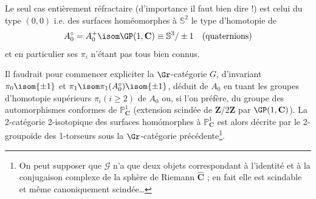 Le seul cas entièrement réfractaire (d'importance il faut bien dire !) est celui du type $(0, 0)$ i.e. des surfaces homéomorphes à $\mathbb{S}^2$ le type d'homotopie de 
$$
A^\circ_0 = A^+_0 \isom \GP (1, \mathbf{C}) \equiv \mathbb{S}^3 / \pm 1 \quad \text{(quaternions)}
$$
et en particulier ses $\pi_i$ n'étant pas tous bien connus.

Il faudrait pour commencer expliciter la $\Gr$-catégorie $G$, d'invariant $\pi_0 \isom \{ \pm 1 \}$ et $\pi_1 \isom \pi_1 (A^\circ_0) \isom \{ \pm 1 \}$, déduit de $A_0$ en tuant les groupes d'homotopie supérieurs $\pi_i (i \geq 2)$ de $A_0$ ou, si l'on préfère, du groupe des automorphismes conformes de $\mathbb{P}^1_{\mathbf{C}}$ (extension scindée de $\mathbf{Z}/2\mathbf{Z}$ par $\GP (1, \mathbf{C})$). La 2-catégorie 2-isotopique des surfaces homómorphes à $\mathbb{P}^1_{\mathbf{C}}$ est alors décrite par le 2-groupoïde des 1-torseurs sous la $\Gr$-catégorie précédente\footnote{On peut supposer que $\mathcal{G}$ n'a que deux objets correspondant à l'identité et à la conjugaison complexe de la sphère de Riemann $\widehat{\mathbf{C}}$ ; en fait elle est scindable et même canoniquement scindée\dots}.



